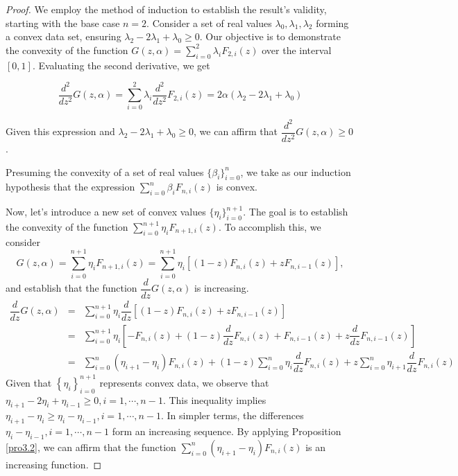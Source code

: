 \documentclass[10pt,a4paper]{amsart}
\begin{document}
\begin{proof}
We employ the method of induction to establish the result's validity, starting with the base case $n=2$.  Consider a set of real values $ \lambda_{0}, \lambda _{1} , \lambda _{2}$ forming a convex data set, ensuring $\lambda_{2} -2\lambda_{1} +\lambda_{0}\geq 0 $. Our objective is to demonstrate the convexity of the function $ G(z,\alpha)=\sum_{i=0}^{2}\lambda_{i}  F_{2,i}(z)$ over the interval $[0,1]$. Evaluating the second derivative, we get

\begin{equation*}
\dfrac{d^2}{dz^2} G(z,\alpha)=\sum_{i=0}^{2} \lambda_{i}  \dfrac{d^2}{dz^2}  F_{2,i}(z)= 2\alpha \left (\lambda_{2} -2\lambda_{1} +\lambda_{0}   \right )
\end{equation*}

Given this expression and $ \lambda_{2} -2\lambda_{1} +\lambda_{0}\geq 0 $, we can affirm that $ \dfrac{d^2}{dz^2} G(z,\alpha) \geq 0 $.



Presuming the convexity of a set of real values $ \{\beta_{i} \}_{i=0}^{n}$, we take as our induction hypothesis that the expression $ \sum_{i=0}^{n} \beta_{i} F_{n,i}(z) $ is convex.


Now, let's introduce a new set of convex values $ \{\eta_{i}\}_{i=0}^{n+1}$. The goal is to establish the convexity of the function $ \sum_{i=0}^{n+1} \eta_{i} F_{n+1,i}(z) $. To accomplish this, we consider
\begin{equation*} 
G(z,\alpha) =\sum_{i=0}^{n+1} \eta_{i} F_{n+1,i}(z)=\sum_{i=0}^{n+1} \eta_{i}\left [(1-z)F_{n,i}(z)+zF_{n,i-1}(z) \right ],  \end{equation*}
and establish that the function $ \dfrac{d}{dz}G(z,\alpha) $ is  increasing.
\begin{eqnarray*}
\dfrac{d}{dz} G(z,\alpha) &=&\sum_{i=0}^{n+1} \eta_{i} \dfrac{d}{dz} \left [(1-z)F_{n,i}(z)+zF_{n,i-1}(z)  \right ]\\
&=&\sum_{i=0}^{n+1} \eta_{i}\left [-F_{n,i}(z)+(1-z) \dfrac{d}{dz} F_{n,i}(z)+F_{n,i-1}(z)+z \dfrac{d}{dz} F_{n,i-1}(z)  \right ]\\
&=&\sum_{i=0}^{n} ( \eta_{i+1}-\eta_{i})F_{n,i}(z)+(1-z)\sum_{i=0}^{n}\eta_{i} \dfrac{d}{dz} F_{n,i}(z)+z \sum_{i=0}^{n}\eta_{i+1}\dfrac{d}{dz} F_{n,i}(z)
\end{eqnarray*}
Given that $\left \{ \eta_{i}  \right \}_{i=0}^{n+1}$ represents convex data, we observe that $  \eta_{i+1}-2 \eta_{i}+ \eta_{i-1}\geq 0, i=1,\cdots,n-1  $. This inequality implies $  \eta_{i+1}- \eta_{i}\geq \eta_{i}- \eta_{i-1} , i=1,\cdots,n-1  $. In simpler terms, the differences $ \eta_{i}- \eta_{i-1} , i=1,\cdots,n-1 $ form an increasing sequence. By applying Proposition \ref{pro3.2}, we can affirm that the function $ \sum_{i=0}^{n} ( \eta_{i+1}-\eta_{i})F_{n,i}(z) $ is an increasing function.   



\end{proof}
\end{document}
